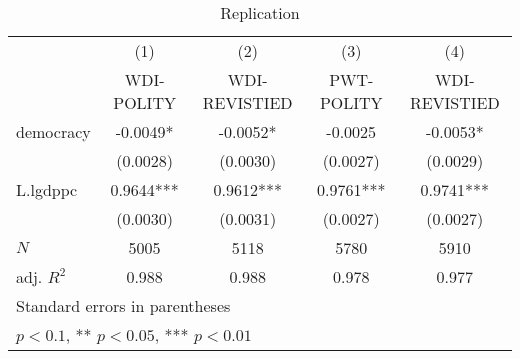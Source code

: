 \begin{table}[htbp]\centering
\def\sym#1{\ifmmode^{#1}\else\(^{#1}\)\fi}
\caption{Replication \label{tab:Replication}}
\begin{tabular}{l*{4}{c}}
\hline\hline
            &\multicolumn{1}{c}{(1)}&\multicolumn{1}{c}{(2)}&\multicolumn{1}{c}{(3)}&\multicolumn{1}{c}{(4)}\\
            &\multicolumn{1}{c}{WDI-POLITY}&\multicolumn{1}{c}{WDI-REVISTIED}&\multicolumn{1}{c}{PWT-POLITY}&\multicolumn{1}{c}{WDI-REVISTIED}\\
\hline
democracy   &     -0.0049*  &     -0.0052*  &     -0.0025   &     -0.0053*  \\
            &    (0.0028)   &    (0.0030)   &    (0.0027)   &    (0.0029)   \\
[1em]
L.lgdppc    &      0.9644***&      0.9612***&      0.9761***&      0.9741***\\
            &    (0.0030)   &    (0.0031)   &    (0.0027)   &    (0.0027)   \\
\hline
\(N\)       &        5005   &        5118   &        5780   &        5910   \\
adj. \(R^{2}\)&       0.988   &       0.988   &       0.978   &       0.977   \\
\hline\hline
\multicolumn{5}{l}{\footnotesize Standard errors in parentheses}\\
\multicolumn{5}{l}{\footnotesize * \(p<0.1\), ** \(p<0.05\), *** \(p<0.01\)}\\
\end{tabular}
\end{table}
